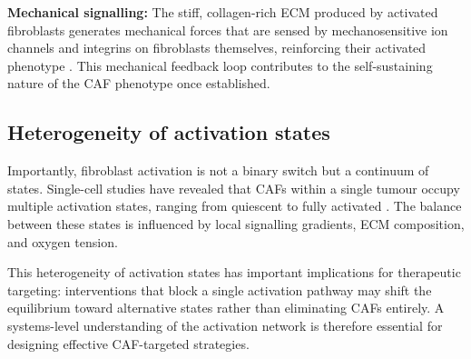 \textbf{Mechanical signalling:} The stiff, collagen-rich ECM produced by activated fibroblasts generates mechanical forces that are sensed by mechanosensitive ion channels and integrins on fibroblasts themselves, reinforcing their activated phenotype \citep{calvo2013}. This mechanical feedback loop contributes to the self-sustaining nature of the CAF phenotype once established.

\subsection{Heterogeneity of activation states}

Importantly, fibroblast activation is not a binary switch but a continuum of states. Single-cell studies have revealed that CAFs within a single tumour occupy multiple activation states, ranging from quiescent to fully activated \citep{erve2024, bartoschek2018spatially}. The balance between these states is influenced by local signalling gradients, ECM composition, and oxygen tension.

This heterogeneity of activation states has important implications for therapeutic targeting: interventions that block a single activation pathway may shift the equilibrium toward alternative states rather than eliminating CAFs entirely. A systems-level understanding of the activation network is therefore essential for designing effective CAF-targeted strategies.
